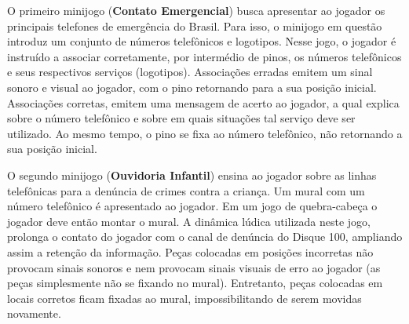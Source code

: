 \begin{figure}
  \vspace{-1.0cm}
\end{figure}


O primeiro minijogo (\textbf{Contato Emergencial}) busca apresentar ao jogador os principais telefones de emergência do Brasil. Para isso, o minijogo em questão introduz um conjunto de números telefônicos e logotipos. Nesse jogo, o jogador é instruído a associar corretamente, por intermédio de pinos, os números telefônicos e seus respectivos serviços (logotipos). Associações erradas emitem um sinal sonoro e visual ao jogador, com o pino retornando para a sua posição inicial. Associações corretas, emitem uma mensagem de acerto ao jogador, a qual explica sobre o número telefônico e sobre em quais situações tal serviço deve ser utilizado. Ao mesmo tempo, o pino se fixa ao número telefônico, não retornando a sua posição inicial.


O segundo minijogo (\textbf{Ouvidoria Infantil}) ensina ao jogador sobre as linhas telefônicas para a denúncia de crimes contra a criança. Um mural com um número telefônico é apresentado ao jogador. %
Em um jogo de quebra-cabeça o jogador deve então montar o mural. A dinâmica lúdica utilizada neste jogo, prolonga o contato do jogador com o canal de denúncia do Disque 100, ampliando assim a retenção da informação. Peças colocadas em posições incorretas não provocam sinais sonoros e nem provocam sinais visuais de erro ao jogador (as peças simplesmente não se fixando no mural). Entretanto, peças colocadas em locais corretos ficam fixadas ao mural, impossibilitando de serem movidas novamente. 


